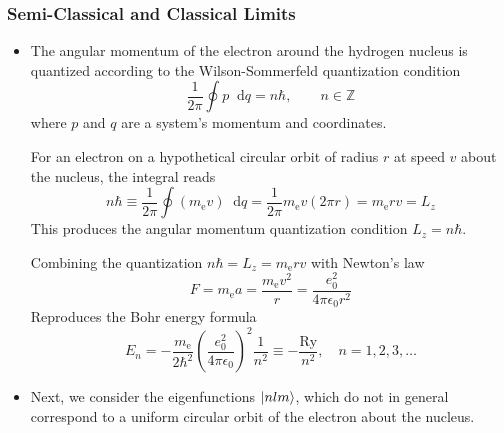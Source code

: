 \documentclass[11pt, a4paper]{article}
\newcommand{\diff}{\mathop{}\!\mathrm{d}} %
\begin{document}
\subsubsection{Semi-Classical and Classical Limits}
\begin{itemize}
	\item The angular momentum of the electron around the hydrogen nucleus is quantized according to the Wilson-Sommerfeld quantization condition
	\begin{equation*}
		\frac{1}{2\pi}\oint p \diff q = n \hbar, \qquad n \in \mathbb{Z}
	\end{equation*}
	where $ p $ and $ q $ are a system's momentum and coordinates. 
	
	For an electron on a hypothetical circular orbit of radius $ r $ at speed $ v $ about the nucleus, the integral reads 
	\begin{equation*}
		n \hbar \equiv \frac{1}{2\pi}\oint (m_{\text{e}}v)\diff q = \frac{1}{2\pi}m_{\text{e}} v (2\pi r) = m_{\text{e}} r v = L_{z}
	\end{equation*}
	This produces the angular momentum quantization condition $ L_{z} = n \hbar $. 
	
	Combining the quantization $ n\hbar = L_{z} = m_{\text{e}}rv $ with Newton's law
	\begin{equation*}
		F = m_{\text{e}}a = \frac{m_{\text{e}}v^{2}}{r} = \frac{e_{0}^{2}}{4\pi \epsilon_{0}r^{2}}
	\end{equation*}
	Reproduces the Bohr energy formula
	\begin{equation*}
		E_{n} = - \frac{m_{\text{e}}}{2\hbar^{2}}\left(\frac{e_{0}^{2}}{4\pi \epsilon_{0}}\right)^{2}\frac{1}{n^{2}} \equiv - \frac{\text{Ry}}{n^{2}}, \quad n = 1, 2, 3, \ldots
	\end{equation*}
	
	\item Next, we consider the eigenfunctions $ \ket{nlm} $, which do not in general correspond to a uniform circular orbit of the electron about the nucleus. 
	

\end{itemize}
\end{document}
